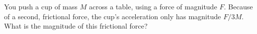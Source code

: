 You push a cup of mass $M$ across a table, using a force of magnitude $F$.
Because of a second, frictional force, the cup's acceleration only has magnitude $F/3M$.
What is the magnitude of this frictional force?\answercheck
